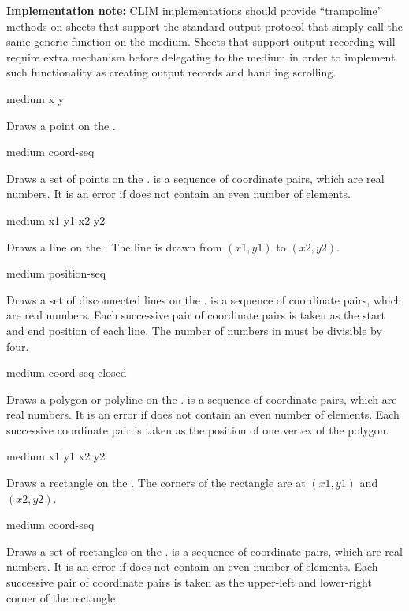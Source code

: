 {\bf Implementation note:} CLIM implementations should provide ``trampoline''
methods on sheets that support the standard output protocol that simply call the
same generic function on the medium.  Sheets that support output recording will
require extra mechanism before delegating to the medium in order to implement
such functionality as creating output records and handling scrolling.

 {medium x y}

Draws a point on the  .

 {medium coord-seq}

Draws a set of points on the  .   is a
sequence of coordinate pairs, which are real numbers.  It is an error if
 does not contain an even number of elements.

 {medium x1 y1 x2 y2}

Draws a line on the  .  The line is drawn from
$(x1,y1)$ to $(x2,y2)$.

 {medium position-seq}

Draws a set of disconnected lines on the  .
 is a sequence of coordinate pairs, which are real numbers.  Each
successive pair of coordinate pairs is taken as the start and end position of
each line. The number of numbers in  must be divisible by four.

 {medium coord-seq closed}

Draws a polygon or polyline on the  .  
is a sequence of coordinate pairs, which are real numbers.  It is an error if
 does not contain an even number of elements.  Each successive
coordinate pair is taken as the position of one vertex of the polygon.

 {medium x1 y1 x2 y2}

Draws a rectangle on the  .  The corners of the
rectangle are at $(x1,y1)$ and $(x2,y2)$.

 {medium coord-seq}

Draws a set of rectangles on the  .   is
a sequence of coordinate pairs, which are real numbers.  It is an error if
 does not contain an even number of elements.  Each successive
pair of coordinate pairs is taken as the upper-left and lower-right corner of
the rectangle.

